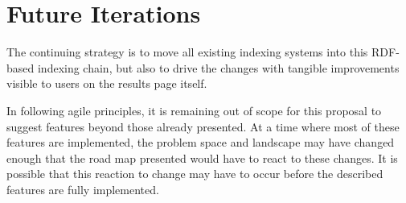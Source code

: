 \section{Future Iterations}

The continuing strategy is to move all existing indexing systems into
this RDF-based indexing chain, but also to drive the changes with
tangible improvements visible to users on the results page itself.

In following agile principles, it is remaining out of scope for this
proposal to suggest features beyond those already presented. At a time
where most of these features are implemented, the problem space and
landscape may have changed enough that the road map presented would
have to react to these changes. It is possible that this reaction to
change may have to occur before the described features are fully implemented.

